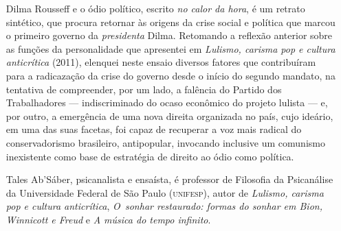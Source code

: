 \begin{enumerate}

\item[Dilma Rousseff e o ódio político,] escrito \emph{no calor da hora}, é um
  retrato sintético, que procura retornar às origens da crise social e política
  que marcou o primeiro governo da \emph{presidenta} Dilma.  Retomando a
  reflexão anterior sobre as funções da personalidade que apresentei em
  \emph{Lulismo, carisma pop e cultura anticrítica} (2011), elenquei neste ensaio
  diversos fatores que contribuíram para a radicazação da crise do governo
  desde o início do segundo mandato, na tentativa de compreender, por um lado,
  a falência do Partido dos Trabalhadores — indiscriminado do ocaso econômico
  do projeto lulista — e, por outro, a emergência de uma nova direita
  organizada no país, cujo ideário, em uma das suas facetas, foi capaz de
  recuperar a voz mais radical do conservadorismo brasileiro, antipopular,
  invocando inclusive um comunismo inexistente como base de estratégia de
  direito ao ódio como política.  

\item[Tales Ab’Sáber,] psicanalista e ensaísta, é professor de Filosofia da Psicanálise da Universidade Federal 
de São Paulo (\textsc{unifesp}), autor de 
\emph{Lulismo, carisma pop e cultura anticrítica},
\textit{O~sonhar
restaurado: formas do sonhar em Bion, Winnicott e Freud} e
\textit{A música do tempo infinito}. 

\end{enumerate}

